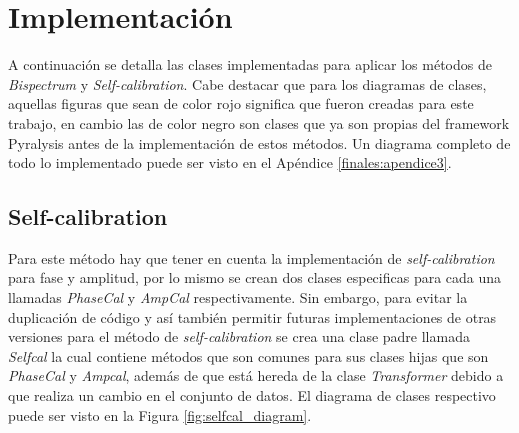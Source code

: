\chapter{Implementación}
\label{cap:implementacion}

A continuación se detalla las clases implementadas para aplicar los métodos de \textit{Bispectrum} y \textit{Self-calibration}. Cabe destacar que para los diagramas de clases, aquellas figuras que sean de color rojo significa que fueron creadas para este trabajo, en cambio las de color negro son clases que ya son propias del framework Pyralysis antes de la implementación de estos métodos. Un diagrama completo de todo lo implementado puede ser visto en el Apéndice \ref{finales:apendice3}. 

\section{Self-calibration}

Para este método hay que tener en cuenta la implementación de \textit{self-calibration} para fase y amplitud, por lo mismo se crean dos clases especificas para cada una llamadas \textit{PhaseCal} y \textit{AmpCal} respectivamente. Sin embargo, para evitar la duplicación de código y así también permitir futuras implementaciones de otras versiones para el método de \textit{self-calibration} se crea una clase padre llamada \textit{Selfcal} la cual contiene métodos que son comunes para sus clases hijas que son \textit{PhaseCal} y \textit{Ampcal}, además de que está hereda de la clase \textit{Transformer} debido a que realiza un cambio en el conjunto de datos. El diagrama de clases respectivo puede ser visto en la Figura \ref{fig:selfcal_diagram}.


